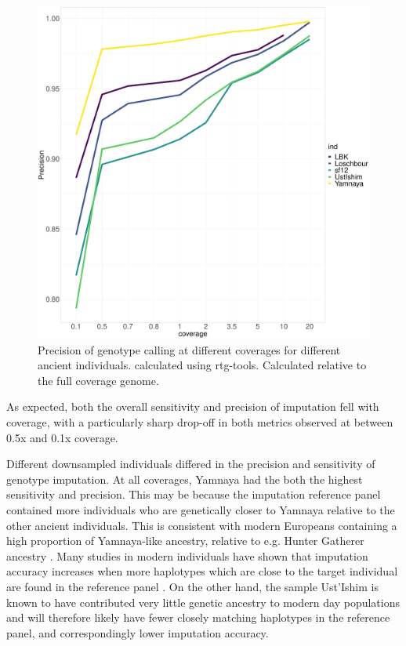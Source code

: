 \begin{figure}[htp]
    \centering
    \includegraphics[width=1.0\textwidth]{../images/chapter1/allDownsampled_rtgtools_Precision.pdf}
    \caption{Precision of genotype calling at different coverages for different ancient individuals.  calculated using rtg-tools. Calculated relative to the full coverage genome.}
    \label{fig:precision_downsampled_rtgtools}
\end{figure}

As expected, both the overall sensitivity and precision of imputation fell with coverage, with a particularly sharp drop-off in both metrics observed at between 0.5x and 0.1x coverage.

Different downsampled individuals differed in the precision and sensitivity of genotype imputation. At all coverages, Yamnaya had the both the highest sensitivity and precision. This may be because the imputation reference panel contained more individuals who are genetically closer to Yamnaya relative to the other ancient individuals. This is consistent with modern Europeans containing a high proportion of Yamnaya-like ancestry, relative to e.g. Hunter Gatherer ancestry \cite{Haak2005}. Many studies in modern individuals have shown that imputation accuracy increases when more haplotypes which are close to the target individual are found in the reference panel \cite{HUANG2009235, delaneau2018integrative}. On the other hand, the sample Ust'Ishim is known to have contributed very little genetic ancestry to modern day populations \cite{Prufer2014} and will therefore likely have fewer closely matching haplotypes in the reference panel, and correspondingly lower imputation accuracy. 

